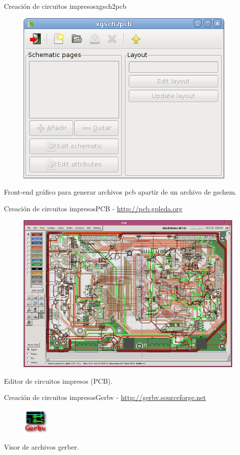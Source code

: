 \documentclass{beamer}
\begin{document}
\begin{frame}{Creación de circuitos impresos}{xgsch2pcb}
  \begin{figure}[!h]
    \centering
    \includegraphics[scale=0.35]{img/xgsch2pcb.png}
  \end{figure}
  Front-end gráfico para generar archivos pcb apartir de un archivo de gschem.
\end{frame}

\begin{frame}{Creación de circuitos impresos}{PCB - \url{http://pcb.gpleda.org}}
  \begin{figure}[!h]
    \centering
    \includegraphics[scale=0.35]{img/pcb.jpg}
  \end{figure}
  Editor de circuitos impresos (PCB).
\end{frame}

\begin{frame}{Creación de circuitos impresos}{Gerbv - \url{http://gerbv.sourceforge.net}}
  \begin{figure}[!h]
    \centering
    \includegraphics{img/gerbv.png}
  \end{figure}
  Visor de archivos gerber.
\end{frame}
\end{document}
